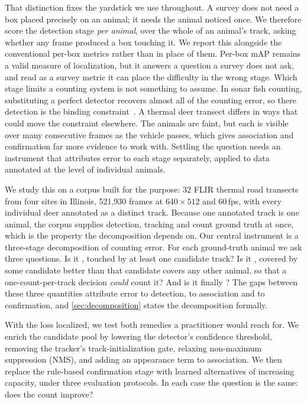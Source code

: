 That distinction fixes the yardstick we use throughout. A survey does not need a box placed
precisely on an animal; it needs the animal noticed once. We therefore score the detection
stage \emph{per animal}, over the whole of an animal's track, asking whether any frame
produced a box touching it. We report this alongside the conventional per-box metrics
rather than in place of them. Per-box mAP remains a valid measure of localization, but it
answers a question a survey does not ask, and read as a survey metric it can place the
difficulty in the wrong stage. Which stage limits a counting system is not something to
assume. In sonar fish counting, substituting a perfect detector recovers almost all of the
counting error, so there detection is the binding constraint~\cite{kay2022caltech}. A
thermal deer transect differs in ways that could move the constraint elsewhere. The animals
are faint, but each is visible over many consecutive frames as the vehicle passes, which
gives association and confirmation far more evidence to work with. Settling the question
needs an instrument that attributes error to each stage separately, applied to data
annotated at the level of individual animals.

We study this on a corpus built for the purpose: 32 FLIR thermal road transects from four
sites in Illinois, 521,930 frames at $640\times512$ and 60\,fps, with every individual deer
annotated as a distinct track. Because one annotated track is one animal, the corpus
supplies detection, tracking and count ground truth at once, which is the property the
decomposition depends on. Our central instrument is a three-stage decomposition of counting
error. For each ground-truth animal we ask three questions. Is it \reachedq, touched by at least one candidate track? Is it \primaryq, covered by some candidate better than that candidate covers any other animal, so that a one-count-per-track decision \emph{could} count it? And is it finally \countedq? The gaps between these three quantities attribute error to detection,
to association and to confirmation, and \cref{sec:decomposition} states the decomposition
formally.

With the loss localized, we test both remedies a practitioner would reach for. We enrich
the candidate pool by lowering the detector's confidence threshold, removing the tracker's
track-initialization gate, relaxing non-maximum suppression (NMS), and adding an appearance
term to association. We then replace the rule-based confirmation stage with learned
alternatives of increasing capacity, under three evaluation protocols. In each case the
question is the same: does the count improve?

